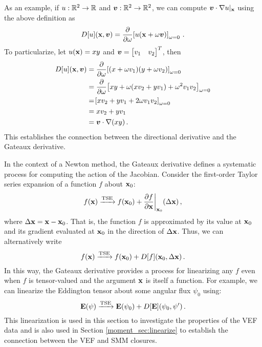 \documentclass[../doc.tex]{subfiles}
\begin{document}
As an example, if $u : \mathbb{R}^2 \rightarrow \mathbb{R}$ and $\boldsymbol{v} : \mathbb{R}^2 \rightarrow \mathbb{R}^2$, we can compute $\boldsymbol{v}\cdot\nabla u|_{\boldsymbol{\mathrm{x}}}$ using the above definition as 
	\begin{equation}
		D[u](\boldsymbol{\mathrm{x}},\boldsymbol{v}) = \frac{\partial }{\partial \omega}\!\left[ u(\boldsymbol{\mathrm{x}} + \omega\boldsymbol{v}) \right]_{\omega = 0} \,. 
	\end{equation}
To particularize, let $u(\boldsymbol{\mathrm{x}}) = xy$ and $\boldsymbol{v} = \begin{bmatrix} v_1 & v_2 \end{bmatrix}^T$, then 
	\begin{equation}
	\begin{aligned}
		D[u](\boldsymbol{\mathrm{x}},\boldsymbol{v}) &= \frac{\partial }{\partial \omega}\!\left[ (x+\omega v_1)(y + \omega v_2) \right]_{\omega = 0} \\
		&= \frac{\partial }{\partial \omega}\!\left[ xy + \omega(xv_2 + yv_1) + \omega^2 v_1 v_2 \right]_{\omega = 0} \\
		&= \!\left[ xv_2 + yv_1 + 2\omega v_1 v_2 \right]_{\omega = 0} \\
		&= x v_2 + y v_1 \\ 
		&= \boldsymbol{v} \cdot \nabla (xy) \,. 
	\end{aligned}
	\end{equation}
This establishes the connection between the directional derivative and the Gateaux derivative. 

In the context of a Newton method, the Gateaux derivative defines a systematic process for computing the action of the Jacobian. Consider the first-order Taylor series expansion of a function $f$ about $\boldsymbol{\mathrm{x}}_0$: 
	\begin{equation}
		f(\boldsymbol{\mathrm{x}}) \xrightarrow{\text{TSE}} f(\boldsymbol{\mathrm{x}}_0) + \frac{\partial f}{\partial \boldsymbol{\mathrm{x}}}\biggr\rvert_{\boldsymbol{\mathrm{x}}_0}(\Delta \boldsymbol{\mathrm{x}}) \,,
	\end{equation}
where $\Delta \boldsymbol{\mathrm{x}} = \boldsymbol{\mathrm{x}} - \boldsymbol{\mathrm{x}}_0$. That is, the function $f$ is approximated by its value at $\boldsymbol{\mathrm{x}}_0$ and its gradient evaluated at $\boldsymbol{\mathrm{x}}_0$ in the direction of $\Delta \boldsymbol{\mathrm{x}}$. 
Thus, we can alternatively write 
	\begin{equation}
		f(\boldsymbol{\mathrm{x}}) \xrightarrow{\text{TSE}} f(\boldsymbol{\mathrm{x}}_0) + D[f](\boldsymbol{\mathrm{x}}_0, \Delta \boldsymbol{\mathrm{x}}) \,. 
	\end{equation}
In this way, the Gateaux derivative provides a process for linearizing any $f$ even when $f$ is tensor-valued and the argument $\boldsymbol{\mathrm{x}}$ is itself a function. For example, we can linearize the Eddington tensor about some angular flux $\psi_0$ using: 
	\begin{equation}
		\boldsymbol{\mathrm{E}}(\psi) \xrightarrow{\text{TSE}} \boldsymbol{\mathrm{E}}(\psi_0) + D[\boldsymbol{\mathrm{E}}](\psi_0,\psi') \,. 
	\end{equation}
This linearization is used in this section to investigate the properties of the VEF data and is also used in Section \ref{moment_sec:linearize} to establish the connection between the VEF and SMM closures. 
\end{document}
